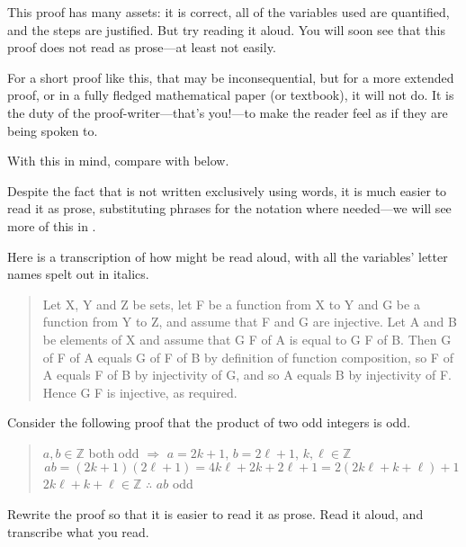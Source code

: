 This proof has many assets: it is correct, all of the variables used are quantified, and the steps are justified. But try reading it aloud. You will soon see that this proof does not read as prose---at least not easily.

For a short proof like this, that may be inconsequential, but for a more extended proof, or in a fully fledged mathematical paper (or textbook), it will not do. It is the duty of the proof-writer---that's you!---to make the reader feel as if they are being spoken to.

With this in mind, compare  with  below.

\begin{extract}
\label{xtrInjectiveWithProse}
\end{extract}

Despite the fact that  is not written exclusively using words, it is much easier to read it as prose, substituting phrases for the notation where needed---we will see more of this in .

Here is a transcription of how  might be read aloud, with all the variables' letter names spelt out in italics.

\begin{quote}
Let X, Y and Z be sets, let F be a function from X to Y and G be a function from Y to Z, and assume that F and G are injective. Let A and B be elements of X and assume that G F of A is equal to G F of B. Then G of F of A equals G of F of B by definition of function composition, so F of A equals F of B by injectivity of G, and so A equals B by injectivity of F. Hence G F is injective, as required.
\end{quote}

\begin{exercise}
Consider the following proof that the product of two odd integers is odd.
\begin{quote}
$a,b \in \mathbb{Z}$ both odd $\Rightarrow$ $a=2k+1$, $b=2\ell+1$, $k,\ell \in \mathbb{Z}$
\[ ab = (2k+1)(2\ell+1) = 4k\ell+2k+2\ell+1 = 2(2k\ell+k+\ell)+1\]
$2k\ell + k + \ell \in \mathbb{Z}$ $\therefore$ $ab$ odd
\end{quote}
Rewrite the proof so that it is easier to read it as prose. Read it aloud, and transcribe what you read.
\end{exercise}

